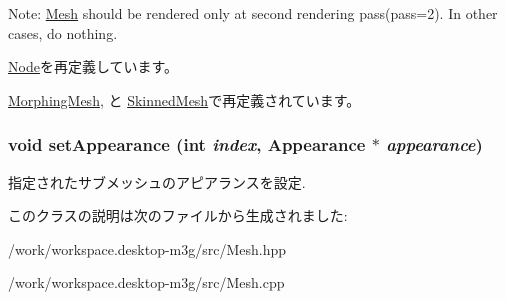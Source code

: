 Note: \hyperlink{classm3g_1_1Mesh}{Mesh} should be rendered only at second rendering pass(pass=2). In other cases, do nothing. 

\hyperlink{classm3g_1_1Node_8babc8a79b78615da51161e94029eea9}{Node}を再定義しています。

\hyperlink{classm3g_1_1MorphingMesh_8babc8a79b78615da51161e94029eea9}{MorphingMesh}, と \hyperlink{classm3g_1_1SkinnedMesh_8babc8a79b78615da51161e94029eea9}{SkinnedMesh}で再定義されています。\hypertarget{classm3g_1_1Mesh_bb03b872c453c4f8f3fe31e8b54d1b52}{
\subsubsection[{setAppearance}]{\setlength{\rightskip}{0pt plus 5cm}void setAppearance (int {\em index}, \/  {\bf Appearance} $\ast$ {\em appearance})}}
\label{classm3g_1_1Mesh_bb03b872c453c4f8f3fe31e8b54d1b52}


指定されたサブメッシュのアピアランスを設定. 

このクラスの説明は次のファイルから生成されました:\begin{CompactItemize}
\item 
/work/workspace.desktop-m3g/src/Mesh.hpp\item 
/work/workspace.desktop-m3g/src/Mesh.cpp\end{CompactItemize}
